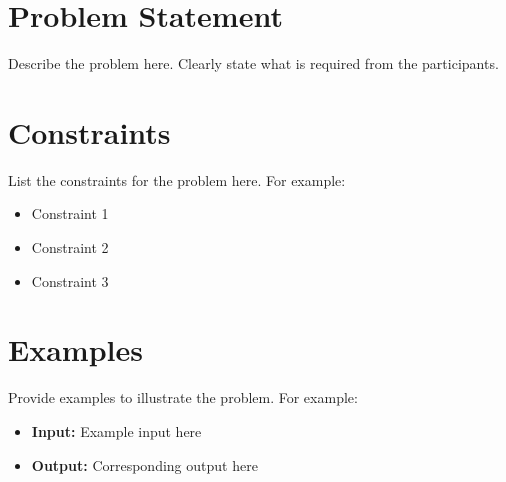 \section*{Problem Statement}
Describe the problem here. Clearly state what is required from the participants.

\section*{Constraints}
List the constraints for the problem here. For example:
\begin{itemize}
    \item Constraint 1
    \item Constraint 2
    \item Constraint 3
\end{itemize}

\section*{Examples}
Provide examples to illustrate the problem. For example:
\begin{itemize}
    \item \textbf{Input:} Example input here
    \item \textbf{Output:} Corresponding output here
\end{itemize}